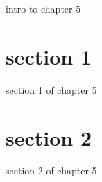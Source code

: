 intro to chapter 5
\section{section 1}
section 1 of chapter 5
\section{section 2}
section 2 of chapter 5